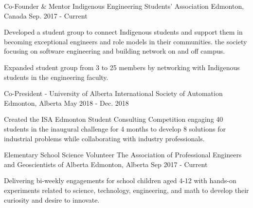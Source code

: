 

\begin{cventries}

  \cventry
    {Co-Founder \& Mentor} %
    {Indigenous Engineering Students’ Association} %
    {Edmonton, Canada} %
    {Sep. 2017 - Current} %
    {
      \begin{cvitems} %
        \item {Developed a student group to connect Indigenous students and support them in becoming exceptional engineers and role models in their communities. the society focusing on software engineering and building network on and off campus.}
        \item {Expanded student group from 3 to 25 members by networking with Indigenous students in the engineering faculty.}
      \end{cvitems}
    }

  \cventry
    {Co-President - University of Alberta} %
    {International Society of Automation} %
    {Edmonton, Alberta} %
    {May 2018 - Dec. 2018} %
    {
      \begin{cvitems} %
        \item {Created the ISA Edmonton Student Consulting Competition engaging 40 students in the inaugural challenge for 4 months to develop 8 solutions for industrial problems while collaborating with industry professionals.}
      \end{cvitems}
    }

\cventry
{Elementary School Science Volunteer} %
{The Association of Professional Engineers and Geoscientists of Alberta } %
{Edmonton, Alberta} %
{Sep 2017 - Current} %
{
	\begin{cvitems} %
		\item {Delivering bi-weekly engagements for school children aged 4-12 with hands-on experiments related to science, technology, engineering, and math to develop their curiosity and desire to innovate.}
	\end{cvitems}
}

\end{cventries}
